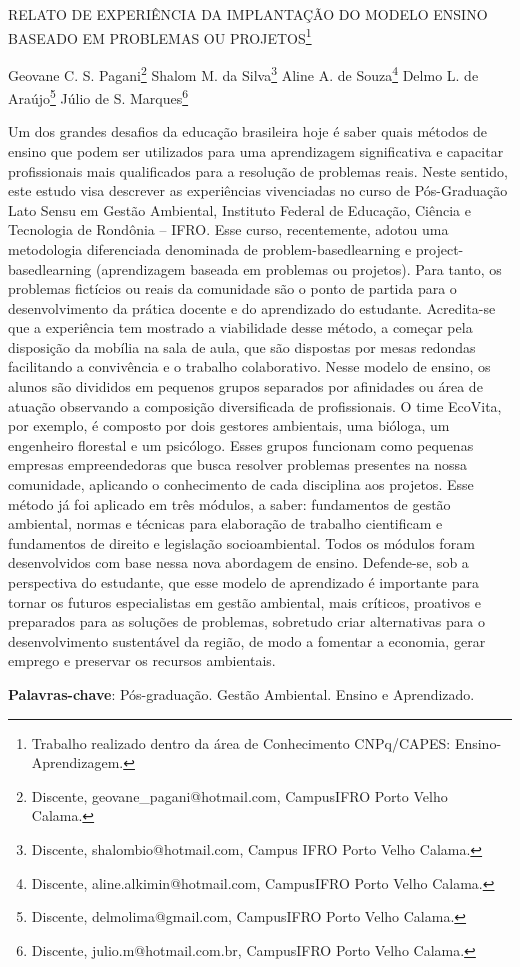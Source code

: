 \documentclass[article,12pt,onesidea,4paper,english,brazil]{abntex2}
\begin{document}
	
	
	\frenchspacing 
	
	\begin{center}
		\LARGE RELATO DE EXPERIÊNCIA DA IMPLANTAÇÃO DO MODELO ENSINO BASEADO EM PROBLEMAS OU PROJETOS\footnote{Trabalho realizado dentro da área de Conhecimento CNPq/CAPES: Ensino-Aprendizagem.}
		
		\normalsize
		Geovane C. S. Pagani\footnote{Discente, geovane\_pagani@hotmail.com, CampusIFRO Porto Velho Calama.} 
		Shalom M. da Silva\footnote{Discente, shalombio@hotmail.com, Campus IFRO Porto Velho Calama.} 
		Aline A. de Souza\footnote{Discente, aline.alkimin@hotmail.com, CampusIFRO Porto Velho Calama.} 
		Delmo L. de Araújo\footnote{Discente, delmolima@gmail.com, CampusIFRO Porto Velho Calama.} 
		Júlio de S. Marques\footnote{Discente, julio.m@hotmail.com.br, CampusIFRO Porto Velho Calama.}
	\end{center}
	
	\noindent Um dos grandes desafios da educação brasileira hoje é saber quais métodos de ensino que podem ser utilizados para uma aprendizagem significativa e capacitar profissionais mais qualificados para a resolução de problemas reais. Neste sentido, este estudo visa descrever as experiências vivenciadas no curso de Pós-Graduação Lato Sensu em Gestão Ambiental, Instituto Federal de Educação, Ciência e Tecnologia de Rondônia – IFRO. Esse curso, recentemente, adotou uma metodologia diferenciada denominada de problem-basedlearning e project-basedlearning (aprendizagem baseada em problemas ou projetos). Para tanto, os problemas fictícios ou reais da comunidade são o ponto de partida para o desenvolvimento da prática docente e do aprendizado do estudante. Acredita-se que a experiência tem mostrado a viabilidade desse método, a começar pela disposição da mobília na sala de aula, que são dispostas por mesas redondas facilitando a convivência e o trabalho colaborativo. Nesse modelo de ensino, os alunos são divididos em pequenos grupos separados por afinidades ou área de atuação observando a composição diversificada de profissionais. O time EcoVita, por exemplo, é composto por dois gestores ambientais, uma bióloga, um engenheiro florestal e um psicólogo. Esses grupos funcionam como pequenas empresas empreendedoras que busca resolver problemas presentes na nossa comunidade, aplicando o conhecimento de cada disciplina aos projetos. Esse método já foi aplicado em três módulos, a saber: fundamentos de gestão ambiental, normas e técnicas para elaboração de trabalho cientificam e fundamentos de direito e legislação socioambiental. Todos os módulos foram desenvolvidos com base nessa nova abordagem de ensino. Defende-se, sob a perspectiva do estudante, que esse modelo de aprendizado é importante para tornar os futuros especialistas em gestão ambiental, mais críticos, proativos e preparados para as soluções de problemas, sobretudo criar alternativas para o desenvolvimento sustentável da região, de modo a fomentar a economia, gerar emprego e preservar os recursos ambientais.
	
	\vspace{\onelineskip}
	
	\noindent
	\textbf{Palavras-chave}: Pós-graduação. Gestão Ambiental. Ensino e Aprendizado.
	
\end{document}
